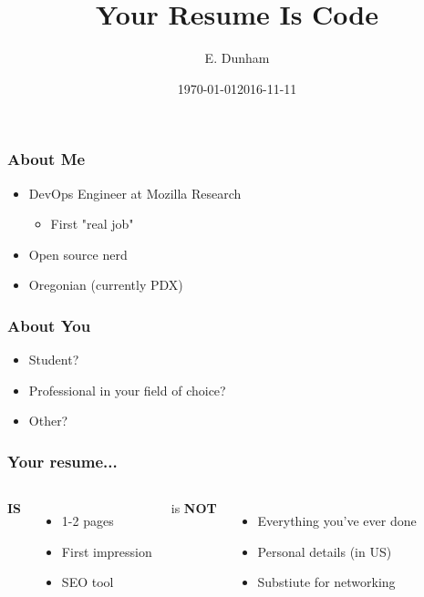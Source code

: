 \documentclass{beamer}
\date{\today}
\title{Your Resume Is Code}
\author{E. Dunham}
\date{2016-11-11}
\begin{document}
\frame{\titlepage}





\begin{frame}
 \frametitle{About Me}



\begin{itemize}
  \item DevOps Engineer at Mozilla Research
\begin{itemize}
  \item First "real job"
\end{itemize}
  \item Open source nerd
  \item Oregonian (currently PDX)
\end{itemize}



\end{frame}
\begin{frame}
 \frametitle{About You}



\begin{itemize}
  \item Student?
  \item Professional in your field of choice?
  \item Other?
\end{itemize}


\end{frame}
\begin{frame}
 \frametitle{Your resume...}



\begin{columns}

\textbf{IS}
\begin{itemize}
  \item 1-2 pages
  \item First impression
  \item SEO tool
\end{itemize}


is \textbf{NOT}
\begin{itemize}
  \item Everything you've ever done
  \item Personal details (in US)
  \item Substiute for networking
\end{itemize}
\end{columns}


\end{frame}
\end{document}
